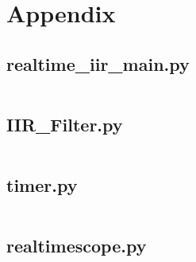 \documentclass{article}
\begin{document}
\pagebreak

\section{Appendix}
\subsection{realtime\_iir\_main.py}
\inputminted{python}{realtime_iir_main.py}

\pagebreak
\subsection{IIR\_Filter.py}
\inputminted{python}{IIR_filter.py}

\pagebreak
\subsection{timer.py}
\inputminted{python}{timer.py}

\pagebreak
\subsection{realtimescope.py}
\inputminted{python}{realtimescope.py}
\end{document}
